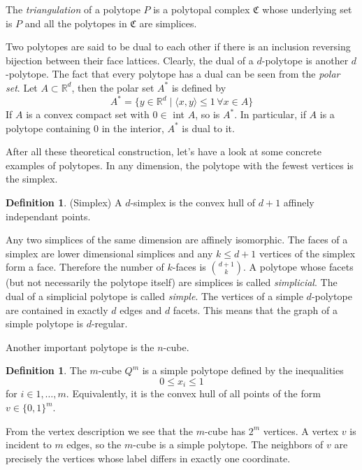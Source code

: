 \documentclass[a4paper,12pt]{book}
\theoremstyle{plain}
\theoremstyle{definition}
\newtheorem{definition}[theorem]{Definition}
\begin{document}
The \textit{triangulation} of a polytope $P$ is a polytopal complex $\mathfrak{C}$ whose
underlying set is $P$ and all the polytopes in $\mathfrak{C}$ are simplices.


Two polytopes are said to be dual to each other if there is an inclusion 
reversing bijection between their face lattices. Clearly, the dual of a 
$d$-polytope is another $d$-polytope. The fact that every polytope has a dual 
can be seen from the \textit{polar set}. Let $A\subset \mathbb{R}^d$, then the 
polar set $A^*$ is defined by
\begin{equation}
 A^* = \{y \in \mathbb{R}^d \mid \langle x,y\rangle \leq 1 \, \forall  x  \in A 
\} 
\end{equation}
If $A$ is a convex compact set with $0 \in$ int $A$, so is $A^*$. In 
particular, if $A$ is a polytope containing $0$ in the interior, $A^*$ is dual 
to it. 

After all these theoretical construction, let's have a look at some concrete examples
of polytopes.
In any dimension, the polytope with the fewest vertices is the simplex. 
\begin{definition}
 (Simplex) A $d$-simplex is the convex hull of $d+1$ affinely independant 
points.
\end{definition}
Any two simplices of the same dimension are affinely isomorphic.
The faces of a simplex are lower dimensional simplices and any $k\le d+1$ vertices
of the simplex form a face. Therefore the number of $k$-faces is $\binom{d+1}{k}$.
 A polytope whose facets 
(but not necessarily the polytope itself) are simplices is called 
\textit{simplicial}. The dual of a simplicial polytope is called 
\textit{simple}. The vertices of a simple $d$-polytope are contained in exactly 
$d$ edges and $d$ facets. This means that the graph of a simple polytope is $d$-regular.

Another important polytope is the $n$-cube.

\begin{definition}
 The $m$-cube $Q^m$ is a simple polytope defined by the inequalities
\begin{equation}
 0 \leq x_i \leq 1 
\end{equation}
for $i \in 1,\dots, m$. Equivalently, it is the convex hull of all points of the form $v \in \{0,1\}^m$.
\end{definition}
From the vertex description we see that the $m$-cube has $2^m$ vertices. A vertex $v$
is incident to $m$ edges, so the $m$-cube is a simple polytope. The neighbors of $v$ are precisely
the vertices whose label differs in exactly one coordinate.
\end{document}
